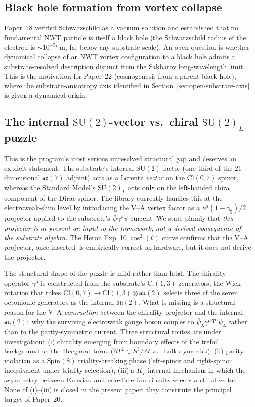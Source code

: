 \documentclass[11pt]{article}
\newcommand{\su}{\mathfrak{su}}
\newcommand{\so}{\mathfrak{so}}
\newcommand{\Spin}{\mathrm{Spin}}
\newcommand{\SU}{\mathrm{SU}}
\begin{document}
\subsection{Black hole formation from vortex collapse}

Paper~18 verified Schwarzschild as a vacuum solution and
established that no fundamental NWT particle is itself a black
hole (the Schwarzschild radius of the electron is
$\sim 10^{-57}\,\mathrm{m}$, far below any substrate scale).  An
open question is whether dynamical collapse of an NWT vortex
configuration to a black hole admits a substrate-resolved
description distinct from the Sakharov long-wavelength limit.
This is the motivation for Paper~22 (cosmogenesis from a parent
black hole), where the substrate-anisotropy axis identified in
Section~\ref{sec:open-substrate-axis} is given a dynamical origin.

\subsection{The internal $\SU(2)$-vector vs.\ chiral $\SU(2)_L$
puzzle}

This is the program's most serious unresolved structural gap and
deserves an explicit statement.  The substrate's internal
$\SU(2)$ factor (one-third of the $21$-dimensional $\so(7)$
adjoint) acts as a Lorentz \emph{vector} on the
$\mathrm{Cl}(0,7)$ spinor, whereas the Standard Model's
$\SU(2)_L$ acts only on the left-handed chiral component of the
Dirac spinor.  The library currently handles this at the
electroweak-shim level by introducing the V--A vertex factor as a
$\gamma^\mu(1 - \gamma_5)/2$ projector applied to the substrate's
$\bar\psi\gamma^\mu\psi$ current.  We state plainly that
\emph{this projector is at present an input to the framework, not
a derived consequence of the substrate algebra}.  The Heron
Exp~10 $\cos^2(\theta)$ curve confirms that the V--A projector,
once inserted, is empirically correct on hardware, but it does
not derive the projector.

The structural shape of the puzzle is mild rather than fatal.
The chirality operator $\gamma^5$ is constructed from the
substrate's $\mathrm{Cl}(1,3)$ generators; the Wick rotation that
takes $\mathrm{Cl}(0,7) \to \mathrm{Cl}(1,3) \otimes \su(2)$
selects three of the seven octonionic generators as the internal
$\su(2)$.  What is missing is a structural reason for the V--A
\emph{contraction} between the chirality projector and the
internal $\su(2)$:\ why the surviving electroweak gauge boson
couples to $\bar\psi_L\gamma^\mu T^a \psi_L$ rather than to the
parity-symmetric current.  Three structural routes are under
investigation:\ (i) chirality emerging from boundary effects of
the trefoil background on the Heegaard torus
($\partial T^2 \subset S^3/2I$ vs.\ bulk dynamics);
(ii) parity violation as a $\Spin(8)$ triality-breaking phase
(left-spinor and right-spinor inequivalent under triality
selection); (iii) a $K_7$-internal mechanism in which the
asymmetry between Eulerian and non-Eulerian circuits selects a
chiral sector.  None of (i)--(iii) is closed in the present paper;
they constitute the principal target of Paper~20.
\end{document}
